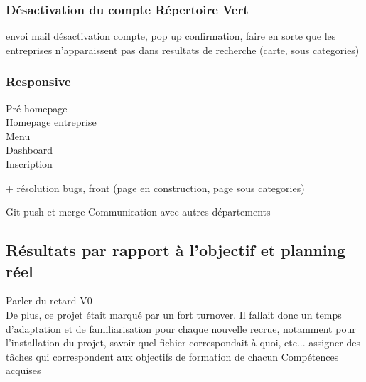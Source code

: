 \subsubsection{Désactivation du compte Répertoire Vert}
envoi mail désactivation compte, pop up confirmation, faire en sorte que les entreprises n'apparaissent pas dans resultats de recherche (carte, sous categories)

\subsubsection{Responsive}
Pré-homepage\\
Homepage entreprise\\
Menu\\
Dashboard\\
Inscription


+ résolution bugs, front (page en construction, page sous categories)

Git push et merge
Communication avec autres départements

\pagebreak
\subsection{Résultats par rapport à l'objectif et planning réel}

Parler du retard V0
\\De plus, ce projet était marqué par un fort turnover. Il fallait donc un temps d'adaptation et de familiarisation pour chaque nouvelle recrue, notamment pour l'installation du projet, savoir quel fichier correspondait à quoi, etc...
assigner des tâches qui correspondent aux objectifs de formation de chacun
Compétences acquises




